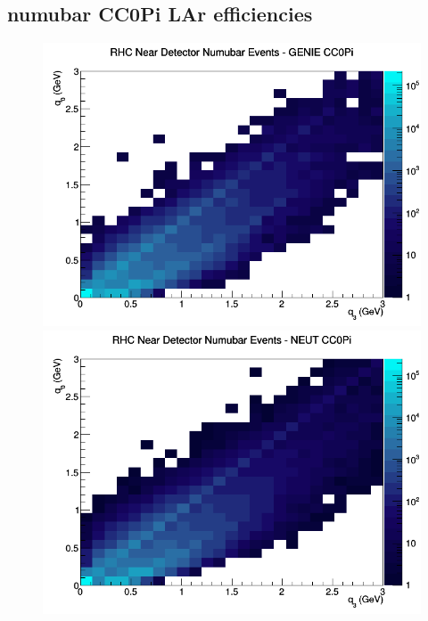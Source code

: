 \documentclass[12pt]{article}
\begin{document}
\subsection{numubar CC0Pi LAr efficiencies}
\begin{figure}[h]
\includegraphics[width=\linewidth]{eff_q0_q3/LAr/CC0Pi_RHC_ND_numubar_q3_q0_GENIE.png}
\endminipage
{}
\includegraphics[width=\linewidth]{eff_q0_q3/LAr/CC0Pi_RHC_ND_numubar_q3_q0_NEUT.png}
\endminipage
{}

\end{figure}
\end{document}
